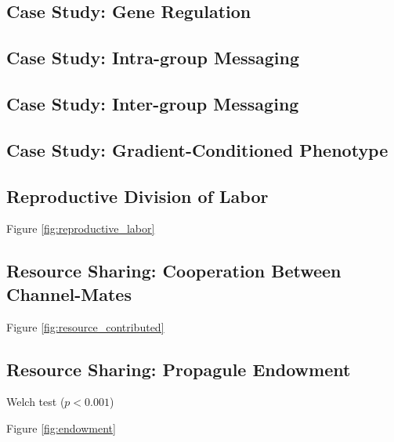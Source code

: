 

\subsection{Case Study: Gene Regulation}



\subsection{Case Study: Intra-group Messaging}



\subsection{Case Study: Inter-group Messaging}



\subsection{Case Study: Gradient-Conditioned Phenotype}




\subsection{Reproductive Division of Labor}

Figure \ref{fig:reproductive_labor}

\subsection{Resource Sharing: Cooperation Between Channel-Mates}

Figure \ref{fig:resource_contributed}

\subsection{Resource Sharing: Propagule Endowment}

Welch test ($p < 0.001$)

Figure \ref{fig:endowment}


